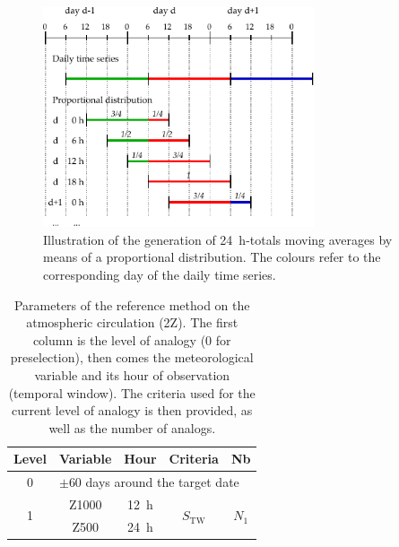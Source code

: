 \documentclass[hess, manuscript]{copernicus}
\begin{document}
\begin{figure}[htb]
	\begin{center}
		\includegraphics[width=8cm]{figures/illustration_disaggregation.pdf}
	\end{center}
	\caption{Illustration of the generation of 24~h-totals moving averages by means of a proportional distribution. The colours refer to the corresponding day of the daily time series.}
	\label{fig:illustration_disaggregation}
\end{figure}


\clearpage


\begin{table}[htb]
	\caption{Parameters of the reference method on the atmospheric circulation (2Z). The first column is the level of analogy (0 for preselection), then comes the meteorological variable and its hour of observation (temporal window). The criteria used for the current level of analogy is then provided, as well as the number of analogs.}
	\footnotesize
	\begin{center}
		\begin{tabular}{ccccc}
			\hline
			Level & Variable & Hour & Criteria & Nb \\ 
			\hline 
			0 & \multicolumn{4}{l}{$\pm 60$ days around the target date} \\
			\hline 
			\multirow{2}{*}{1} & Z1000 & 12~h & \multirow{2}{*}{$S_{\text{TW}}$} & \multirow{2}{*}{$N_{1}$} \\
			& Z500 & 24~h & & \\ 
			\hline 
		\end{tabular} 
	\end{center}
	\label{table:method_2Z}
\end{table}
\end{document}
